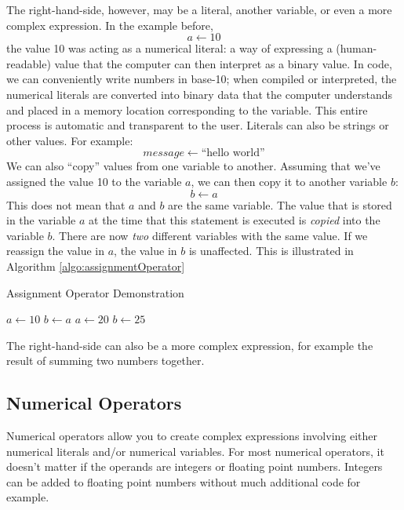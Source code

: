 The right-hand-side, however, may be a  \gls{literal}, another variable, or 
even a more complex \gls{expression}.  In the example before, 
  $$a \leftarrow 10$$
the value 10 was acting as a numerical literal: a way of expressing a (human-readable) 
value that the computer can then interpret as a binary value.  In code, we
can conveniently write numbers in base-10; when compiled or interpreted, 
the numerical literals are converted into binary data that the computer
understands and placed in a memory location corresponding to the variable.
This entire process is automatic and transparent to the user.
Literals can also be strings or other values.  For example:
  $$message \leftarrow \text{``hello world''}$$
We can also ``copy'' values from one variable to another.  Assuming that we've assigned
the value 10 to the variable $a$, we can then copy it to another variable $b$: 
  $$b \leftarrow a$$
This does not mean that $a$ and $b$ are the same variable.  The value that is stored
in the variable $a$ at the time that this statement is executed is \emph{copied} into 
the variable $b$.  There are now \emph{two} different variables with the same value.
If we reassign the value in $a$, the value in $b$ is unaffected.  This is illustrated in
Algorithm \ref{algo:assignmentOperator}

\begin{algorithm}[H]
\caption{Assignment Operator Demonstration}
\label{algo:assignmentOperator}
$a \leftarrow 10$ \;
$b \leftarrow a$ \;
$a \leftarrow 20$ \;
$b \leftarrow 25$ \;
\end{algorithm}

The right-hand-side can also be a more complex expression, for example
the result of summing two numbers together.

\subsection{Numerical Operators}

Numerical operators allow you to create complex expressions involving either
numerical literals and/or numerical variables.  For most numerical operators, 
it doesn't matter if the operands are integers or floating point numbers.  Integers
can be added to 
floating point numbers without much additional code for example.

